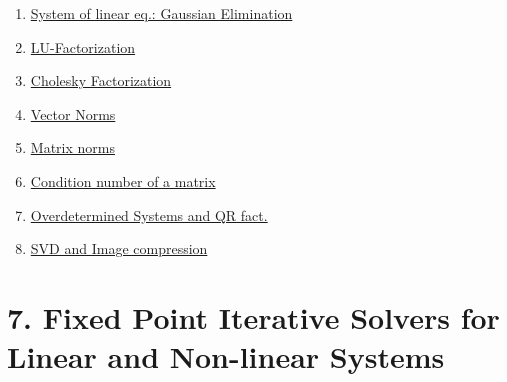 \documentclass[11pt]{article}
\begin{document}
\vspace{-0.5cm}

\begin{multicols}{2}
	\begin{enumerate}
		\item \href{https://mp.weixin.qq.com/s/Z_13kehDMeB4_i88-9_GUw}{System of linear eq.: Gaussian Elimination}	%
		\item \href{https://mp.weixin.qq.com/s/8WBh4ilKGracDy3tYRUsDA}{LU-Factorization}	%
		\item \href{https://mp.weixin.qq.com/s/hcgXql0waFNvYluhlB5uDw}{Cholesky Factorization}	%
		\item \href{https://mp.weixin.qq.com/s/NqoT8ERfz-LFmm7wfHGUfg}{Vector Norms}	%
		\item \href{https://mp.weixin.qq.com/s/6M0sQoxl8mHelkVNf5yu7A}{Matrix norms}	%
		\item \href{https://mp.weixin.qq.com/s/f0eZ2Q5cJsCjYRBCw89jkQ}{Condition number of a matrix}	%
		\item \href{https://mp.weixin.qq.com/s/iT0RD2HiMk5WthwTX46-qQ}{Overdetermined Systems and QR fact.}	%
		\item \href{https://mp.weixin.qq.com/s/-z3cDzIGcDXNzKJHdkQQWQ}{SVD and Image compression}	%
	\end{enumerate}
\end{multicols}

\newpage

\section*{7. Fixed Point Iterative Solvers for Linear and Non-linear Systems}

\vspace{-0.5cm}
\end{document}
